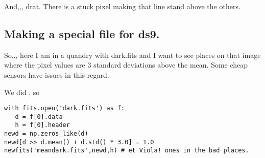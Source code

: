 And,,, drat. There is a stuck pixel making that line stand above the others.



\subsection{Making a special file for ds9.}

So,,, here I am in a quandry with dark.fits and I want to see places
on that image where the pixel values are 3 standard deviations above
the mean. Some cheap sensors have issues in this regard.

We did , so

\begingroup \fontsize{10pt}{10pt}
\selectfont
\begin{verbatim} 
with fits.open('dark.fits') as f:
   d = f[0].data
   h = f[0].header 
newd = np.zeros_like(d)
newd[d >> d.mean() + d.std() * 3.0] = 1.0
newfits('meandark.fits',newd,h) # et Viola! ones in the bad places.
\end{verbatim}
\endgroup
